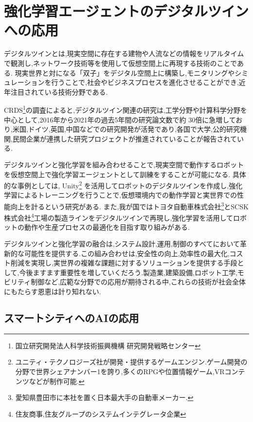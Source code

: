 \section{強化学習エージェントのデジタルツインへの応用}
デジタルツインとは,現実空間に存在する建物や人流などの情報をリアルタイムで観測し,ネットワーク技術等を使用して仮想空間上に再現する技術のことである.
現実世界と対になる「双子」をデジタル空間上に構築し,モニタリングやシミュレーションを行うことで,社会やビジネスプロセスを進化させることができ,近年注目されている技術分野である.\par 
CRDS\footnote{国立研究開発法人科学技術振興機構 研究開発戦略センター}の調査によると,デジタルツイン関連の研究は,工学分野や計算科学分野を中心として,2016年から2021年の過去5年間の研究論文数で約
30倍に急増しており,米国,ドイツ,英国,中国などでの研究開発が活発であり,各国で大学,公的研究機関,民間企業が連携した研究プロジェクトが推進されていることが報告されている\cite{CRDS2022DigitalTwin}.

デジタルツインと強化学習を組み合わせることで,現実空間で動作するロボットを仮想空間上で強化学習エージェントとして訓練をすることが可能になる.
具体的な事例としては,
Unity\footnote{ユニティ・テクノロジーズ社が開発・提供するゲームエンジン.ゲーム開発の分野で世界シェアナンバー1を誇り,多くのRPGや位置情報ゲーム,VRコンテンツなどが制作可能.}
を活用してロボットのデジタルツインを作成し,強化学習によるトレーニングを行うことで,仮想環境内での動作学習と実世界での性能向上を計るという研究がある\cite{unity_robot_digital_twin_2021}.
また,我が国ではトヨタ自動車株式会社\footnote{愛知県豊田市に本社を置く日本最大手の自動車メーカー.}とSCSK株式会社\footnote{住友商事,住友グループのシステムインテグレータ企業}工場の製造ラインをデジタルツインで再現し,強化学習を活用してロボットの動作や生産プロセスの最適化を目指す取り組みがある\cite{scsk_toyota_digital_twin_2024}.

デジタルツインと強化学習の融合は,システム設計,運用,制御のすべてにおいて革新的な可能性を提供する.この組み合わせは,安全性の向上,効率性の最大化,コスト削減を実現し,実世界の複雑な課題に対するソリューションを提供する手段として,今後ますます重要性を増していくだろう.製造業,建築設備,ロボット工学,モビリティ制御など,広範な分野での応用が期待される中,これらの技術が社会全体にもたらす恩恵は計り知れない.

\subsection{スマートシティへのAIの応用}

